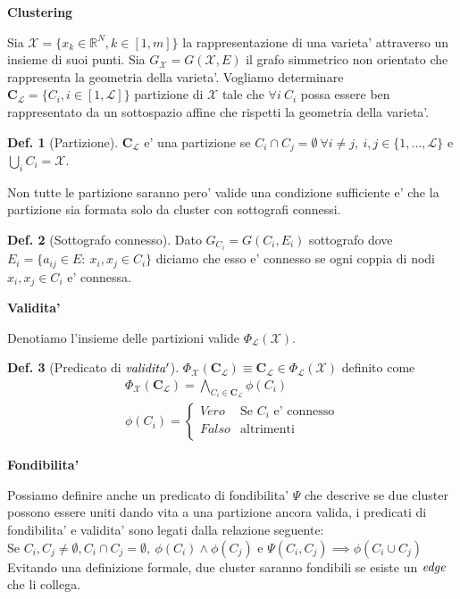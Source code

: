 \documentclass[a4, landscape]{seminar}
\theoremstyle{definition}
\newtheorem{definition}{Def.}
\newcommand{\RR}{\mathbb{R}}
\def\bc{\begin{center}}
\def\ec{\end{center}}
\def\bs{\begin{slide}\begingroup\small}
\def\es{\endgroup\end{slide}}
\begin{document}
\bs
\bc{\bf\color{blue}Clustering}\ec
Sia $\mathcal{X} = \{x_k\in\RR^N, k\in [1, m]\}$ la rappresentazione di una varieta' attraverso un insieme di suoi punti. Sia $G_{\mathcal{X}}=G(\mathcal{X}, E)$ il grafo simmetrico non orientato che rappresenta la geometria della varieta'. Vogliamo determinare $\textbf{C}_{\mathcal{L}}=\{C_i, i\in [1, \mathcal{L}]\}$ partizione di $\mathcal{X}$ tale che $\forall i\ C_i$ possa essere ben rappresentato da un sottospazio affine che rispetti la geometria della varieta'.
\begin{definition}[Partizione]
$\textbf{C}_{\mathcal{L}}$ e' una partizione se $C_i\cap C_j = \emptyset \ \forall i\neq j, \ i,j\in \{1, ..., \mathcal{L} \}$ e $\bigcup_{i} C_i = \mathcal{X}$.
\end{definition}
Non tutte le partizione saranno pero' valide una condizione sufficiente e' che la partizione sia formata solo da cluster con sottografi connessi.
\begin{definition}[Sottografo connesso]
Dato $G_{C_i}=G(C_i, E_i)$ sottografo dove $E_i=\{a_{ij}\in E: \ x_i, x_j\in C_i\}$ diciamo che esso e' connesso se ogni coppia di nodi $x_i, x_j\in C_i$ e' connessa.
\end{definition}
\es

\bs
\bc{\bf\color{blue}Validita'}\ec
Denotiamo l'insieme delle partizioni valide $\Phi_\mathcal{L}(\mathcal{X})$.
\begin{definition}[Predicato di $\it{validita'}$]
$\Phi_\mathcal{X}(\textbf{C}_\mathcal{L}) \equiv \textbf{C}_\mathcal{L}\in \Phi_\mathcal{L}(\mathcal{X})$ definito come
\begin{equation*}
\begin{gathered}
\Phi_\mathcal{X}(\textbf{C}_\mathcal{L}) = \bigwedge_{C_i\in\textbf{C}_\mathcal{L}}\phi(C_i) \\
\phi(C_i) = 
  \begin{cases}
                                   Vero & \text{Se $C_i$ e' connesso} \\
                                   Falso & \text{altrimenti} \\
  \end{cases}
\end{gathered}
\end{equation*}
\end{definition}
\bc{\bf\color{blue}Fondibilita'}\ec
Possiamo definire anche un predicato di fondibilita' $\Psi$ che descrive se due cluster possono essere uniti dando vita a una partizione ancora valida, i predicati di fondibilita' e validita' sono legati dalla relazione seguente: \\
Se $C_i,C_j\neq \emptyset, C_i\cap C_j =\emptyset, \ \phi(C_i)\wedge\phi(C_j)$ e $\Psi(C_i, C_j) \implies \phi(C_i\cup C_j)$
Evitando una definizione formale, due cluster saranno fondibili se esiste un $\it{edge}$ che li collega.
\es
\end{document}
